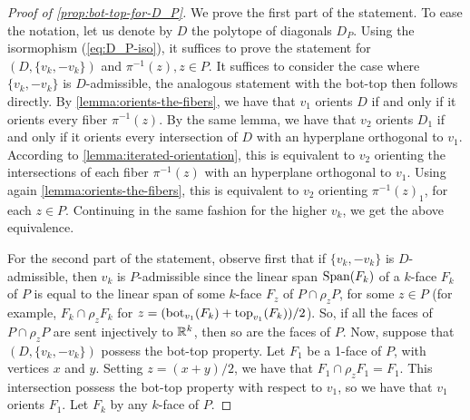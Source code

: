 \begin{proof}[Proof of \cref{prop:bot-top-for-D_P}]
    We prove the first part of the statement.
    To ease the notation, let us denote by $D$ the polytope of diagonals $D_P$. 
    Using the isormophism (\ref{eq:D_P-iso}), it suffices to prove the statement for $(D,\{v_k,-v_k\})$ and $\pi^{-1}(z), z \in P$.
    It suffices to consider the case where $\{v_k,-v_k\}$ is $D$-admissible, the analogous statement with the bot-top then follows directly. 
    By \cref{lemma:orients-the-fibers}, we have that $v_1$ orients $D$ if and only if it orients every fiber $\pi^{-1}(z)$.
    By the same lemma, we have that $v_2$ orients $D_1$ if and only if it orients every intersection of $D$ with an hyperplane orthogonal to $v_1$.
    According to \cref{lemma:iterated-orientation}, this is equivalent to $v_2$ orienting the intersections of each fiber $\pi^{-1}(z)$ with an hyperplane orthogonal to $v_1$. 
    Using again \cref{lemma:orients-the-fibers}, this is equivalent to $v_2$ orienting $\pi^{-1}(z)_1$, for each $z \in P$.
    Continuing in the same fashion for the higher $v_k$, we get the above equivalence. 

    For the second part of the statement, observe first that if $\{v_k,-v_k\}$ is $D$-admissible, then $v_k$ is $P$-admissible since the linear span $\operatorname{\mathrm{Span}}(F_k)$ of a $k$-face $F_k$ of $P$ is equal to the linear span of some $k$-face $F_z$ of $P\cap \rho_z P$, for some $z \in P$ (for example, $F_k \cap \rho_z F_k$ for $z=(\operatorname{bot}_{v_1}(F_k)+\operatorname{top}_{v_1}(F_k))/2$). 
    So, if all the faces of $P\cap \rho_z P$ are sent injectively to $\mathbb{R}^k$, then so are the faces of $P$. 
    Now, suppose that $(D,\{v_k,-v_k\})$ possess the bot-top property. 
    Let $F_1$ be a 1-face of $P$, with vertices $x$ and $y$. 
    Setting $z=(x+y)/2$, we have that $F_1 \cap \rho_z F_1 = F_1$.
    This intersection possess the bot-top property with respect to $v_1$, so we have that $v_1$ orients $F_1$. 
    Let $F_k$ by any $k$-face of $P$. 
\end{proof}




